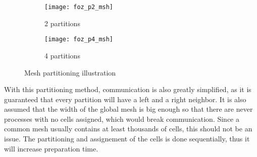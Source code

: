 \begin{figure}[!htp]
	\begin{subfigure}[b]{0.5\columnwidth}
		\centering
		\texttt{[image: foz\_p2\_msh]}
		\caption{2 partitions}
		\label{fig:foz_p2_msh}
	\end{subfigure}%
	\begin{subfigure}[b]{0.5\columnwidth}
		\centering
		\texttt{[image: foz\_p4\_msh]}
		\caption{4 partitions}
		\label{fig:foz_p4_msh}
	\end{subfigure}%

	\caption{Mesh partitioning illustration}
	\label{fig:partitioning}
\end{figure}

With this partitioning method, communication is also greatly simplified, as it is guaranteed that every partition will have a left and a right neighbor.
It is also assumed that the width of the global mesh is big enough so that there are never processes with no cells assigned, which would break communication.
Since a common mesh usually contains at least thousands of cells, this should not be an issue.
The partitioning and assignement of the cells is done sequentially, thus it will increase preparation time.
